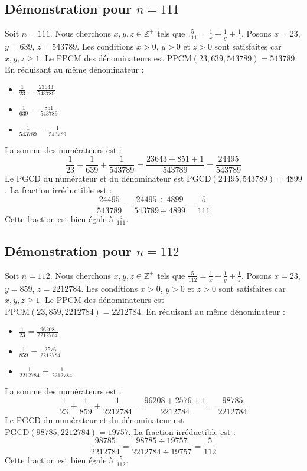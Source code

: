 \documentclass[11pt,a4paper]{article}
\begin{document}
\subsection{Démonstration pour $n = 111$}
Soit $n = 111$. Nous cherchons $x, y, z \in \mathbb{Z}^{+}$ tels que $\frac{5}{111} = \frac{1}{x} + \frac{1}{y} + \frac{1}{z}$.
Posons $x = 23$, $y = 639$, $z = 543789$.
Les conditions $x > 0$, $y > 0$ et $z > 0$ sont satisfaites car $x, y, z \geq 1$.
Le PPCM des dénominateurs est $\text{PPCM}(23, 639, 543789) = 543789$.
En réduisant au même dénominateur :
\begin{itemize}
    \item $\frac{1}{23} = \frac{23643}{543789}$
    \item $\frac{1}{639} = \frac{851}{543789}$
    \item $\frac{1}{543789} = \frac{1}{543789}$
\end{itemize}
La somme des numérateurs est :
$$ \frac{1}{23} + \frac{1}{639} + \frac{1}{543789} = \frac{23643 + 851 + 1}{543789} = \frac{24495}{543789} $$
Le PGCD du numérateur et du dénominateur est $\text{PGCD}(24495, 543789) = 4899$.
La fraction irréductible est :
$$ \frac{24495}{543789} = \frac{24495 \div 4899}{543789 \div 4899} = \frac{5}{111} $$
Cette fraction est bien égale à $\frac{5}{111}$.

\subsection{Démonstration pour $n = 112$}
Soit $n = 112$. Nous cherchons $x, y, z \in \mathbb{Z}^{+}$ tels que $\frac{5}{112} = \frac{1}{x} + \frac{1}{y} + \frac{1}{z}$.
Posons $x = 23$, $y = 859$, $z = 2212784$.
Les conditions $x > 0$, $y > 0$ et $z > 0$ sont satisfaites car $x, y, z \geq 1$.
Le PPCM des dénominateurs est $\text{PPCM}(23, 859, 2212784) = 2212784$.
En réduisant au même dénominateur :
\begin{itemize}
    \item $\frac{1}{23} = \frac{96208}{2212784}$
    \item $\frac{1}{859} = \frac{2576}{2212784}$
    \item $\frac{1}{2212784} = \frac{1}{2212784}$
\end{itemize}
La somme des numérateurs est :
$$ \frac{1}{23} + \frac{1}{859} + \frac{1}{2212784} = \frac{96208 + 2576 + 1}{2212784} = \frac{98785}{2212784} $$
Le PGCD du numérateur et du dénominateur est $\text{PGCD}(98785, 2212784) = 19757$.
La fraction irréductible est :
$$ \frac{98785}{2212784} = \frac{98785 \div 19757}{2212784 \div 19757} = \frac{5}{112} $$
Cette fraction est bien égale à $\frac{5}{112}$.
\end{document}
